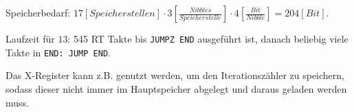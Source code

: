 \documentclass{CInf_practice}
\begin{document}


Speicherbedarf: $17 [Speicherstellen] \cdot 3 [\frac{Nibbles}{Speicherstelle}] \cdot 4 [\frac{Bit}{Nibble}] = 204 [Bit]$.

Laufzeit für $13$: 545 RT Takte bis \texttt{JUMPZ END} ausgeführt ist, danach beliebig viele Takte in \texttt{END: JUMP END}. 


\subex{}

Das X-Register kann z.B. genutzt werden, um den Iterationszähler zu speichern,
sodass dieser nicht immer im Hauptspeicher abgelegt und daraus geladen werden
muss.

\end{document}
